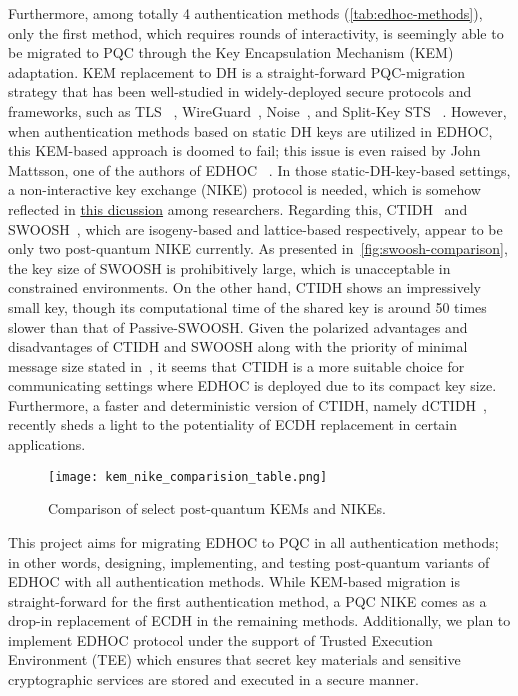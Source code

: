 Furthermore, among totally 4 authentication methods (\autoref{tab:edhoc-methods}), only
the first method, which requires
rounds of interactivity, is seemingly able to be migrated to PQC through the Key Encapsulation
Mechanism (KEM) adaptation. KEM replacement to DH is a straight-forward PQC-migration strategy that
has been well-studied in widely-deployed secure protocols and frameworks, such as TLS
~\cite{optls,kemtls}, WireGuard~\cite{pqc-wireguard}, Noise~\cite{pqc-noise}, and Split-Key STS
~\cite{split-keys-sts}. However, when authentication methods based on static DH keys are utilized in EDHOC, this KEM-based
approach is doomed to fail; this issue is even raised by John Mattsson, one of the authors of EDHOC
~\cite{nike-group-discussion,edhoc-security-overview}. In those static-DH-key-based settings, a
non-interactive key exchange (NIKE) protocol is needed, which is somehow reflected
in \href{https://groups.google.com/a/list.nist.gov/g/pqc-forum/c/y_nQ3xMDRy8/m/uI1nU5iuAAAJ}{this dicussion}
among researchers.
Regarding this, CTIDH~\cite{ctidh}
and SWOOSH~\cite{swoosh}, which are isogeny-based and lattice-based respectively,
appear to be only two post-quantum NIKE currently. As presented in~\autoref{fig:swoosh-comparison},
the key size of SWOOSH is prohibitively large, which is unacceptable in constrained
environments. On the other hand, CTIDH shows an impressively small key, though its
computational time of the shared key is around 50 times slower than that of
Passive-SWOOSH\@. Given the polarized advantages and disadvantages of CTIDH
and SWOOSH along with the priority of minimal message size stated in~\cite{edhoc-rfc},
it seems that CTIDH is a more suitable choice for communicating
settings where EDHOC is deployed due to its compact key size. Furthermore, a faster and
deterministic version of CTIDH, namely dCTIDH~\cite{dctidh}, recently sheds a light
to the potentiality of ECDH replacement in certain applications.

\begin{figure}
    \centering
    \texttt{[image: kem\_nike\_comparision\_table.png]}
    \caption{Comparison of select post-quantum KEMs and NIKEs\cite{swoosh}.}
    \label{fig:swoosh-comparison}
\end{figure}

This project aims for migrating EDHOC to PQC in all authentication methods; in
other words, designing, implementing, and testing post-quantum variants of EDHOC
with all authentication methods.
While KEM-based migration is straight-forward for the first authentication method,
a PQC NIKE comes as a drop-in replacement of ECDH in the remaining methods.
Additionally, we plan to implement EDHOC protocol under the support of
Trusted Execution Environment (TEE) which ensures that secret key materials and
sensitive cryptographic services are stored and executed in a secure manner.

